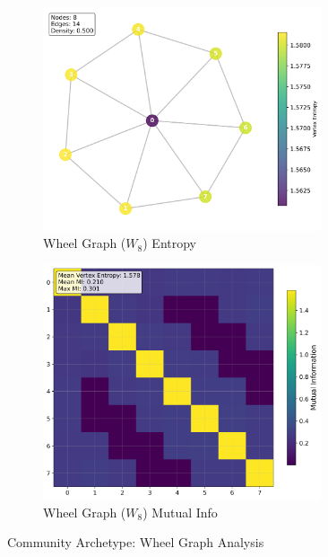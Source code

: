 \documentclass[12pt, letterpaper]{article}
\begin{document}
\begin{figure}[H]
    \centering
    \begin{subfigure}[b]{0.48\textwidth}
        \includegraphics[width=0.9\textwidth]{images/Graph Visualizations/Community/Wheel_vertex_entropy.png}
        \caption{Wheel Graph ($W_8$) Entropy}
        \label{fig:wheel_entropy}
    \end{subfigure}
    \hfill
    \begin{subfigure}[b]{0.48\textwidth}
        \includegraphics[width=0.9\textwidth]{images/Graph Visualizations/Community/Wheel_MI_Matrix.png}
        \caption{Wheel Graph ($W_8$) Mutual Info}
        \label{fig:wheel_mi}
    \end{subfigure}
    \caption{Community Archetype: Wheel Graph Analysis}
    \label{fig:wheel_analysis}
\end{figure}
\end{document}
